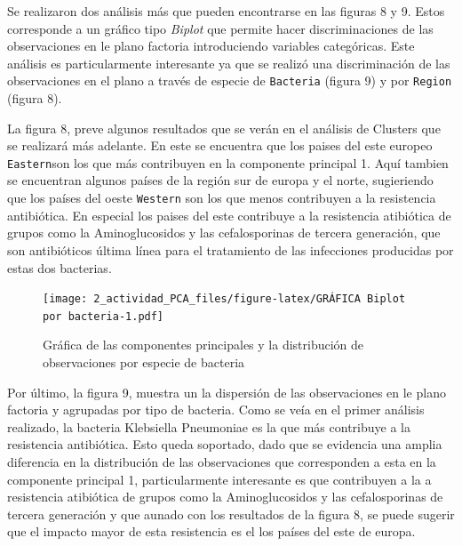 \documentclass[
]{article}
\begin{document}
Se realizaron dos análisis más que pueden encontrarse en las figuras 8 y
9. Estos corresponde a un gráfico tipo \emph{Biplot} que permite hacer
discriminaciones de las observaciones en le plano factoria introduciendo
variables categóricas. Este análisis es particularmente interesante ya
que se realizó una discriminación de las observaciones en el plano a
través de especie de \texttt{Bacteria} (figura 9) y por \texttt{Region}
(figura 8).

La figura 8, preve algunos resultados que se verán en el análisis de
Clusters que se realizará más adelante. En este se encuentra que los
paises del este europeo \texttt{Eastern}son los que más contribuyen en
la componente principal 1. Aquí tambien se encuentran algunos países de
la región sur de europa y el norte, sugieriendo que los países del oeste
\texttt{Western} son los que menos contribuyen a la resistencia
antibiótica. En especial los paises del este contribuye a la resistencia
atibiótica de grupos como la Aminoglucosidos y las cefalosporinas de
tercera generación, que son antibióticos última línea para el
tratamiento de las infecciones producidas por estas dos bacterias.

\begin{figure}
\centering
\texttt{[image: 2\_actividad\_PCA\_files/figure-latex/GRÁFICA Biplot por bacteria-1.pdf]}
\caption{Gráfica de las componentes principales y la distribución de
observaciones por especie de bacteria}
\end{figure}

Por último, la figura 9, muestra un la dispersión de las observaciones
en le plano factoria y agrupadas por tipo de bacteria. Como se veía en
el primer análisis realizado, la bacteria Klebsiella Pneumoniae es la
que más contribuye a la resistencia antibiótica. Esto queda soportado,
dado que se evidencia una amplia diferencia en la distribución de las
observaciones que corresponden a esta en la componente principal 1,
particularmente interesante es que contribuyen a la a resistencia
atibiótica de grupos como la Aminoglucosidos y las cefalosporinas de
tercera generación y que aunado con los resultados de la figura 8, se
puede sugerir que el impacto mayor de esta resistencia es el los países
del este de europa.
\end{document}
